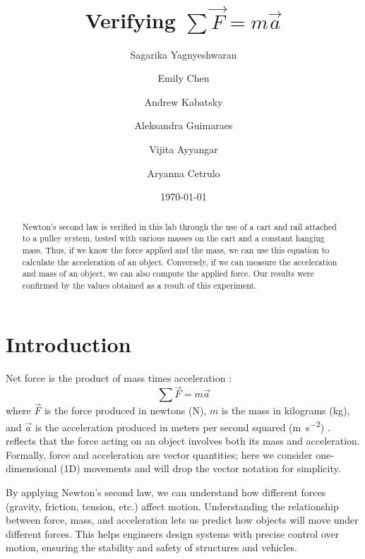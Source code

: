 \documentclass[reprint,amsmath,amssymb,aps,twoside]{revtex4-2}
\begin{document}
\setcounter{page}{31}
\title{Verifying $\sum\vec{F} = m\vec{a}$}

\author{Sagarika Yagnyeshwaran}
\author{Emily Chen}
\author{Andrew Kabatsky}
\author{Aleksandra Guimaraes}
\author{Vijita Ayyangar}
\author{Aryanna Cetrulo}
\date{\today}

\begin{abstract}
Newton’s second law is verified in this lab through the use of a cart and rail attached to a pulley system, tested with various masses on the cart and a constant hanging mass. Thus, if we know the force applied and the mass, we can use this equation to calculate the acceleration of an object. Conversely, if we can measure the acceleration and mass of an object, we can also compute the applied force. Our results were confirmed by the values obtained as a result of this experiment.
\end{abstract}


\maketitle\thispagestyle{mytitlepage}





\section{Introduction}
Net force is the product of mass times acceleration \cite{newton1687principia}:
\begin{equation} 
\sum \vec{F} = m\vec{a}
\label{eq:1}
\end{equation}
where $\vec{F}$ is the force produced in newtons (\unit{\newton}), $m$ is the mass in kilograms (\unit{\kilo\gram}), and $\vec{a}$ is the acceleration produced in meters per second squared (\unit{\meter\per\second\squared}) \cite{newton1687principia}.  reflects that the force acting on an object involves both its mass and acceleration. Formally, force and acceleration are vector quantities; here we consider one-dimensional (1D) movements and will drop the vector notation for simplicity. 

By applying Newton's second law, we can understand how different forces (gravity, friction, tension, etc.) affect motion. Understanding the relationship between force, mass, and acceleration lets us predict how objects will move under different forces. This helps engineers design systems with precise control over motion, ensuring the stability and safety of structures and vehicles.
\end{document}
